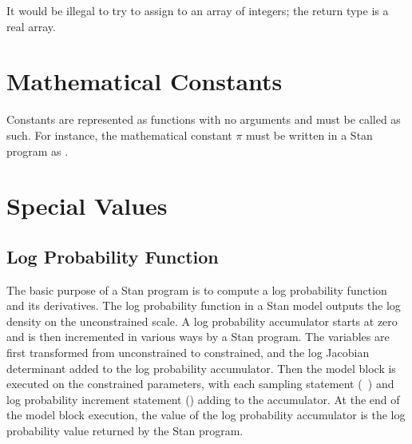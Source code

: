 \begin{description}
\begin{description}
\begin{description}
\begin{description}
It would be illegal to try to assign  to an array of integers; the return type is a real array.

\section{Mathematical Constants}

Constants are represented as functions with no arguments and must be called as such.  For instance, the mathematical constant $\pi$ must be written in a Stan program as .

\begin{description} %

\section{Special Values}

\begin{description}  %



\section{Log Probability Function}

The basic purpose of a Stan program is to compute a log probability function and its derivatives.  The log probability function in a Stan model outputs the log density on the unconstrained scale.  A log probability accumulator starts at zero and is then incremented in various ways by a Stan program.  The variables are first transformed from unconstrained to constrained, and the log Jacobian determinant added to the log probability accumulator.  Then the model block is executed on the constrained parameters, with each sampling statement (\Verb| |) and log probability increment statement () adding to the accumulator.  At the end of the model block execution, the value of the log probability accumulator is the log probability value returned by the Stan program.


\end{description}
\end{description}
\end{description}
\end{description}
\end{description}
\end{description}
